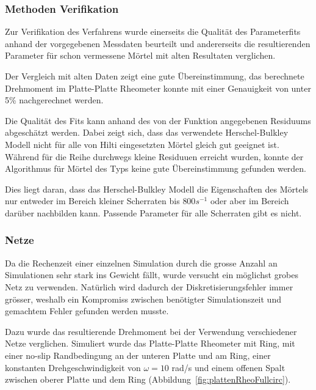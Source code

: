 \subsubsection{Methoden Verifikation}
Zur Verifikation des Verfahrens wurde einerseits die Qualität des Parameterfits anhand der vorgegebenen Messdaten beurteilt und andererseits die resultierenden Parameter für schon vermessene Mörtel mit alten Resultaten verglichen.

Der Vergleich mit alten Daten zeigt eine gute Übereinstimmung, das berechnete Drehmoment im Platte-Platte Rheometer konnte mit einer Genauigkeit von unter 5\% nachgerechnet werden.

Die Qualität des Fits kann anhand des von der Funktion  angegebenen Residuums abgeschätzt werden. Dabei zeigt sich, dass das verwendete Herschel-Bulkley Modell nicht für alle von Hilti eingesetzten Mörtel gleich gut geeignet ist. Während für die \hit{} Reihe durchwegs kleine Residuuen erreicht wurden, konnte der Algorithmus für Mörtel des \re{} Typs keine gute Übereinstimmung gefunden werden.

Dies liegt daran, dass das Herschel-Bulkley Modell die Eigenschaften des Mörtels nur entweder im Bereich kleiner Scherraten bis $800 s^{-1}$ oder aber im Bereich darüber nachbilden kann. Passende Parameter für alle Scherraten gibt es nicht.
%
\subsubsection{Netze}
Da die Rechenzeit einer einzelnen Simulation durch die grosse Anzahl an Simulationen sehr stark ins Gewicht fällt, wurde versucht ein möglichst grobes Netz zu verwenden. Natürlich wird dadurch der Diskretisierungsfehler immer grösser, weshalb ein Kompromiss zwischen benötigter Simulationszeit und gemachtem Fehler gefunden werden musste.

Dazu wurde das resultierende Drehmoment bei der Verwendung verschiedener Netze verglichen. Simuliert wurde das Platte-Platte Rheometer mit Ring, mit einer \glqq{}no-slip\grqq{} Randbedingung an der unteren Platte und am Ring, einer konstanten Drehgeschwindigkeit von $\omega=10$ rad/s und einem offenen Spalt zwischen oberer Platte und dem Ring (Abbildung~\ref{fig:plattenRheoFullcirc}). 

